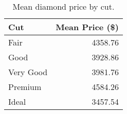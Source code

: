 \begin{table}[!h]

\caption{\label{tab:diamond-price-by-cut}Mean diamond price by cut.}
\centering
\begin{tabular}[t]{lr}
\toprule
Cut & Mean Price (\$)\\
\midrule
Fair & 4358.76\\
Good & 3928.86\\
Very Good & 3981.76\\
Premium & 4584.26\\
Ideal & 3457.54\\
\bottomrule
\end{tabular}
\end{table}
